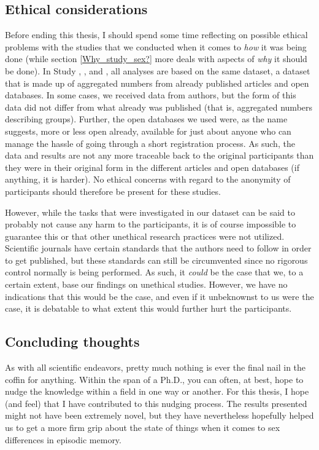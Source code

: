 \subsection{Ethical considerations}

Before ending this thesis, I should spend some time reflecting on possible ethical problems with the studies that we conducted when it comes to \emph{how} it was being done (while section \ref{Why_study_sex?} more deals with aspects of \emph{why} it should be done). In Study , , and , all analyses are based on the same dataset, a dataset that is made up of aggregated numbers from already published articles and open databases. In some cases, we received data from authors, but the form of this data did not differ from what already was published (that is, aggregated numbers describing groups). Further, the open databases we used were, as the name suggests, more or less open already, available for just about anyone who can manage the hassle of going through a short registration process. As such, the data and results are not any more traceable back to the original participants than they were in their original form in the different articles and open databases (if anything, it is harder). No ethical concerns with regard to the anonymity of participants should therefore be present for these studies.

However, while the tasks that were investigated in our dataset can be said to probably not cause any harm to the participants, it is of course impossible to guarantee this or that other unethical research practices were not utilized. Scientific journals have certain standards that the authors need to follow in order to get published, but these standards can still be circumvented since no rigorous control normally is being performed. As such, it \emph{could} be the case that we, to a certain extent, base our findings on unethical studies. However, we have no indications that this would be the case, and even if it unbeknownst to us were the case, it is debatable to what extent this would further hurt the participants.

\subsection{Concluding thoughts}

As with all scientific endeavors, pretty much nothing is ever the final nail in the coffin for anything. Within the span of a Ph.D., you can often, at best, hope to nudge the knowledge within a field in one way or another. For this thesis, I hope (and feel) that I have contributed to this nudging process. The results presented might not have been extremely novel, but they have nevertheless hopefully helped us to get a more firm grip about the state of things when it comes to sex differences in episodic memory.
